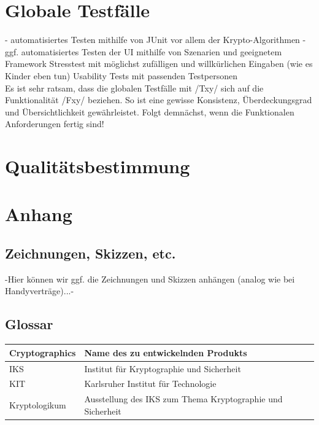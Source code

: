 \documentclass{article}
\begin{document}
\section{Globale Testfälle}
- automatisiertes Testen mithilfe von JUnit vor allem der Krypto-Algorithmen
- ggf. automatisiertes Testen der UI mithilfe von Szenarien und geeignetem Framework
Stresstest mit möglichst zufälligen und willkürlichen Eingaben (wie es Kinder eben tun)
Usability Tests mit passenden Testpersonen\\
Es ist sehr ratsam, dass die globalen Testfälle mit /Txy/ sich auf die Funktionalität /Fxy/ beziehen. So ist eine gewisse Konsistenz, Überdeckungsgrad und Übersichtlichkeit gewährleistet. Folgt demnächst, wenn die Funktionalen Anforderungen fertig sind!

\section{Qualitätsbestimmung}

\section{Anhang}

\subsection{Zeichnungen, Skizzen, etc.}

-Hier können wir ggf. die Zeichnungen und Skizzen anhängen (analog wie bei Handyverträge)...-

\subsection{Glossar}

\begin{tabular}{| l | l |}
\hline
Cryptographics & Name des zu entwickelnden Produkts \\ \hline
IKS & Institut für Kryptographie und Sicherheit \\ \hline
KIT & Karlsruher Institut für Technologie \\ \hline
Kryptologikum & Ausstellung des IKS zum Thema Kryptographie und Sicherheit \\ \hline
\end{tabular}
\end{document}
